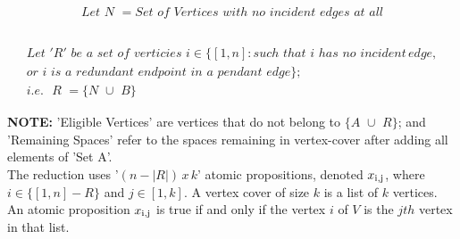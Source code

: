 \documentclass[11pt]{llncs}
\begin{document}
	\vspace{-8mm}

	\begin{gather*}
		Let \,\, N \,\, =  Set \,\, of  \,\, Vertices \,\, with \,\, no \,\, incident \,\, edges \,\, at \,\, all\\ \\
	\end{gather*}

	\vspace{-20mm}
	
	\begin{gather*}
		Let \,\, 'R' \,\, be \,\, a \,\, set \,\, of \,\, verticies \,\,  i  \in \{[1, n]: such \,\, that \,\,  i \,\, has \,\, no \,\, incident \, edge,\\
		or\,\,  i \,\, is \,\, a \,\, redundant \,\, endpoint \,\, in \,\, a \,\, pendant \,\, edge \};\\
		i.e. \,\,\,\, R \,\, = \{N \,\, \cup \,\, B\}
	\end{gather*}

	\noindent \textbf{NOTE:} 'Eligible Vertices' are vertices that do not belong to $\{A \,\, \cup \,\, R\}$; and 'Remaining Spaces' refer to the spaces remaining in vertex-cover after adding all elements of 'Set A'.\\

	The reduction uses '$(n - |R|) \, x \, k$' atomic propositions, denoted  $x\textsubscript{i,j}$, where $i \in \{[1, n] - R\}$ and $j \in [1, k]$. A vertex cover of size $k$ is a list of $k$ vertices. An atomic proposition $x\textsubscript{i,j}$ is true if and only if the vertex $i$ of $V$ is the $jth$ vertex in that list.\\
	
\end{document}
